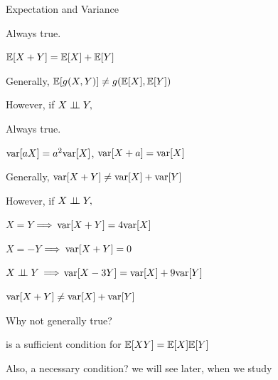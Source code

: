 \begin{frame}{Expectation and Variance}

{
\plitemsep 0.05in
\bci 

\item<1-> Always true. 

$\mathbb{E}[ X+Y ] = \mathbb{E}[ X ] + \mathbb{E}[ Y ]$

\item<2-> Generally,
$\mathbb{E}[ g(X,Y) ] \neq g(\mathbb{E}[ X ],\mathbb{E}[ Y ])$

\medskip

\item<3-> However, if $X \perp \!\!\! \perp Y,$
\item<4-> 

\eci
}
{
\plitemsep 0.1in
\bci 

\item<5-> Always true. 

$\text{var}[ aX ] = a^2 \text{var}[ X ]$, $\text{var}[ X + a ] = \text{var}[ X ]$

\item<6-> Generally,
$\text{var}[ X+Y ] \neq \text{var}[ X ] + \text{var}[ Y ]$

\medskip

\item<7-> However, if $X \perp \!\!\! \perp Y,$

\item<7-> 

\plitemsep 0.02in
\bci
\item<8-> $X=Y$ $\Longrightarrow$ $\text{var}[ X+Y ] = 4 \text{var}[ X ]$
\item<9-> $X=-Y$ $\Longrightarrow$ $\text{var}[ X+Y ] = 0$
\item<10-> $X \perp \!\!\! \perp Y$ $\Longrightarrow$ $\text{var}[ X-3Y ] = \text{var}[ X ] + 9 \text{var}[ Y ]$
\eci

\eci

}
\end{frame}


\begin{frame}{$\text{var}[ X + Y ] \neq \text{var}[ X ] + \text{var}[ Y ]$}

\plitemsep 0.1in
\bci [$\circ$]

\item<1-> Why not generally true?


\item<3->  is a sufficient condition for $\mathbb{E}[ XY ] = \mathbb{E}[ X ]\mathbb{E}[ Y ]$ 

\item<5-> Also, a necessary condition? we will see later, when we study  
\eci

\end{frame}

